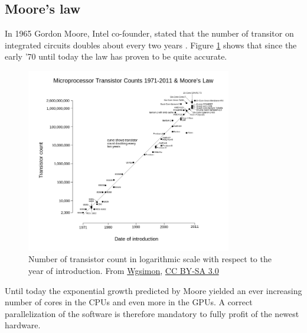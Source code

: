 \subsection{Moore's law}
In 1965 Gordon Moore, Intel co-founder, stated that the number of transitor on integrated circuits doubles about every two years \cite{moore}. Figure \ref{moore} shows that since the early '70 until today the law has proven to be quite accurate.

\begin{figure}
\includegraphics[width=0.8\textwidth]{architectures/moores.png}
\caption{Number of transistor count in logarithmic scale with respect to the year of introduction. From \href{https://commons.wikimedia.org/wiki/User:Wgsimon}{Wgsimon}, \href{http://creativecommons.org/licenses/by-sa/3.0/}{CC BY-SA 3.0}}
\label{moore}
\end{figure}
\clearpage

Until today the exponential growth predicted by Moore yielded an ever increasing number of cores in the CPUs and even more in the GPUs. A correct parallelization of the software is therefore mandatory to fully profit of the newest hardware.

